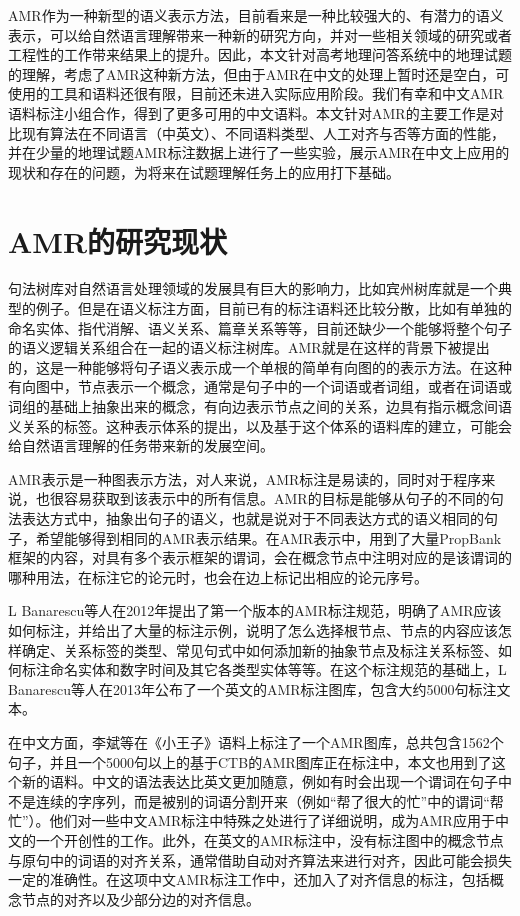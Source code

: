 \documentclass[master, winfont]{njuthesis}
\begin{document}
AMR作为一种新型的语义表示方法，目前看来是一种比较强大的、有潜力的语义表示，可以给自然语言理解带来一种新的研究方向，并对一些相关领域的研究或者工程性的工作带来结果上的提升\cite{kai2015improving}\cite{Pan2015}。因此，本文针对高考地理问答系统中的地理试题的理解，考虑了AMR这种新方法，但由于AMR在中文的处理上暂时还是空白，可使用的工具和语料还很有限，目前还未进入实际应用阶段。我们有幸和中文AMR语料标注小组合作，得到了更多可用的中文语料。本文针对AMR的主要工作是对比现有算法在不同语言（中英文）、不同语料类型、人工对齐与否等方面的性能，并在少量的地理试题AMR标注数据上进行了一些实验，展示AMR在中文上应用的现状和存在的问题，为将来在试题理解任务上的应用打下基础。

\section{AMR的研究现状}
句法树库对自然语言处理领域的发展具有巨大的影响力，比如宾州树库就是一个典型的例子。但是在语义标注方面，目前已有的标注语料还比较分散，比如有单独的命名实体、指代消解、语义关系、篇章关系等等，目前还缺少一个能够将整个句子的语义逻辑关系组合在一起的语义标注树库。AMR就是在这样的背景下被提出的，这是一种能够将句子语义表示成一个单根的简单有向图的的表示方法。在这种有向图中，节点表示一个概念，通常是句子中的一个词语或者词组，或者在词语或词组的基础上抽象出来的概念，有向边表示节点之间的关系，边具有指示概念间语义关系的标签。这种表示体系的提出，以及基于这个体系的语料库的建立，可能会给自然语言理解的任务带来新的发展空间。

AMR表示是一种图表示方法\cite{Banarescu2013Abstract}，对人来说，AMR标注是易读的，同时对于程序来说，也很容易获取到该表示中的所有信息。AMR的目标是能够从句子的不同的句法表达方式中，抽象出句子的语义，也就是说对于不同表达方式的语义相同的句子，希望能够得到相同的AMR表示结果。在AMR表示中，用到了大量PropBank框架的内容，对具有多个表示框架的谓词，会在概念节点中注明对应的是该谓词的哪种用法，在标注它的论元时，也会在边上标记出相应的论元序号。

L Banarescu等人\cite{banarescu2012abstract}在2012年提出了第一个版本的AMR标注规范，明确了AMR应该如何标注，并给出了大量的标注示例，说明了怎么选择根节点、节点的内容应该怎样确定、关系标签的类型、常见句式中如何添加新的抽象节点及标注关系标签、如何标注命名实体和数字时间及其它各类型实体等等。在这个标注规范的基础上，L Banarescu等人\cite{Banarescu2013Abstract}在2013年公布了一个英文的AMR标注图库，包含大约5000句标注文本。

在中文方面，李斌等\cite{Li2016Annotating}在《小王子》语料上标注了一个AMR图库，总共包含1562个句子，并且一个5000句以上的基于CTB的AMR图库正在标注中，本文也用到了这个新的语料。中文的语法表达比英文更加随意，例如有时会出现一个谓词在句子中不是连续的字序列，而是被别的词语分割开来（例如“帮了很大的忙”中的谓词“帮忙”）。他们对一些中文AMR标注中特殊之处进行了详细说明，成为AMR应用于中文的一个开创性的工作。此外，在英文的AMR标注中，没有标注图中的概念节点与原句中的词语的对齐关系，通常借助自动对齐算法来进行对齐，因此可能会损失一定的准确性。在这项中文AMR标注工作中，还加入了对齐信息的标注，包括概念节点的对齐以及少部分边的对齐信息。
\end{document}
